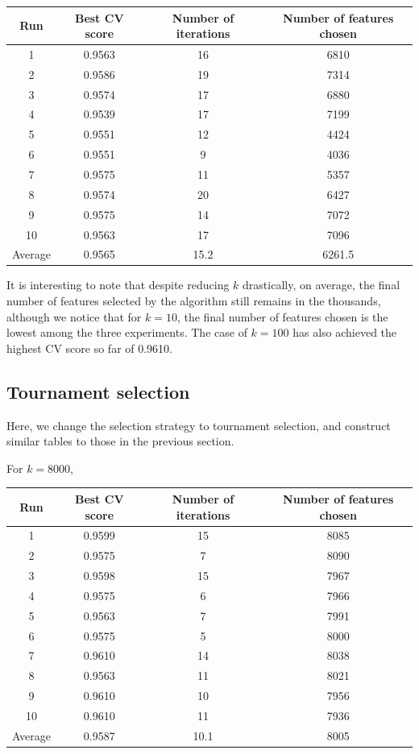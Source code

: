 \documentclass[12pt, twoside, a4paper]{report}
\begin{document}
\begin{center}
    \begin{tabular}{| c | c | c | c | } \hline
    Run & Best CV score & Number of iterations & Number of features chosen \\ \hline \hline
    1 & 0.9563 & 16 & 6810 \\ \hline
	2 & 0.9586  & 19 & 7314 \\ \hline
	3 & 0.9574 & 17 & 6880 \\ \hline
	4 & 0.9539 & 17 & 7199 \\ \hline
	5 & 0.9551 & 12 & 4424 \\ \hline
	6 & 0.9551 & 9 & 4036 \\ \hline
	7 & 0.9575 & 11 & 5357 \\ \hline
	8 & 0.9574 & 20 & 6427 \\ \hline
	9 & 0.9575 & 14 & 7072 \\ \hline
	10 & 0.9563 & 17 & 7096 \\ \hline
	Average & 0.9565 & 15.2 & 6261.5 \\ \hline
    \end{tabular}
\end{center}

It is interesting to note that despite reducing $k$ drastically, on average, the final number of features selected by the algorithm still remains in the thousands, although we notice that for $k=10$, the final number of features chosen is the lowest among the three experiments. The case of $k=100$ has also achieved the highest CV score so far of 0.9610.

\subsection{Tournament selection}

Here, we change the selection strategy to tournament selection, and construct similar tables to those in the previous section.

For $k=8000$,
\begin{center}
    \begin{tabular}{| c | c | c | c | } \hline
    Run & Best CV score & Number of iterations & Number of features chosen \\ \hline \hline
    1 & 0.9599 & 15 & 8085 \\ \hline
	2 & 0.9575  & 7 & 8090 \\ \hline
	3 & 0.9598 & 15 & 7967 \\ \hline
	4 & 0.9575 & 6 & 7966 \\ \hline
	5 & 0.9563 & 7 & 7991 \\ \hline
	6 & 0.9575 & 5 & 8000 \\ \hline
	7 & 0.9610 & 14 & 8038 \\ \hline
	8 & 0.9563 & 11 & 8021 \\ \hline
	9 & 0.9610 & 10 & 7956 \\ \hline
	10 & 0.9610 & 11 & 7936 \\ \hline
	Average & 0.9587 & 10.1 & 8005 \\ \hline
    \end{tabular}
\end{center}
\end{document}
